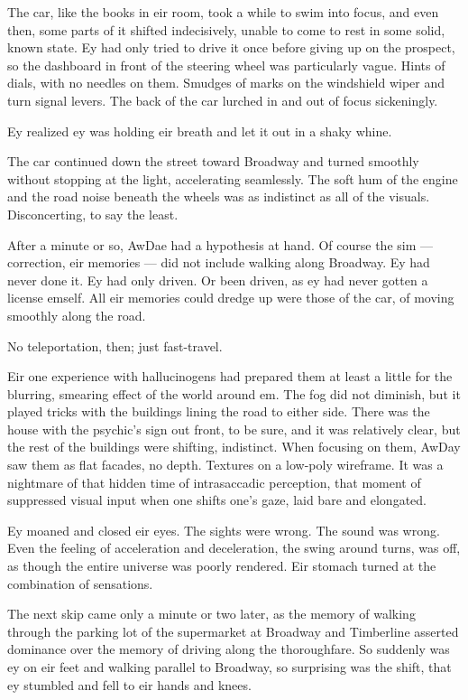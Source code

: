The car, like the books in eir room, took a while to swim into focus, and even then, some parts of it shifted indecisively, unable to come to rest in some solid, known state. Ey had only tried to drive it once before giving up on the prospect, so the dashboard in front of the steering wheel was particularly vague. Hints of dials, with no needles on them. Smudges of marks on the windshield wiper and turn signal levers. The back of the car lurched in and out of focus sickeningly.

Ey realized ey was holding eir breath and let it out in a shaky whine.

The car continued down the street toward Broadway and turned smoothly without stopping at the light, accelerating seamlessly. The soft hum of the engine and the road noise beneath the wheels was as indistinct as all of the visuals. Disconcerting, to say the least.

After a minute or so, AwDae had a hypothesis at hand. Of course the sim --- correction, eir memories --- did not include walking along Broadway. Ey had never done it. Ey had only driven. Or been driven, as ey had never gotten a license emself. All eir memories could dredge up were those of the car, of moving smoothly along the road.

No teleportation, then; just fast-travel.

Eir one experience with hallucinogens had prepared them at least a little for the blurring, smearing effect of the world around em. The fog did not diminish, but it played tricks with the buildings lining the road to either side. There was the house with the psychic's sign out front, to be sure, and it was relatively clear, but the rest of the buildings were shifting, indistinct. When focusing on them, AwDay saw them as flat facades, no depth. Textures on a low-poly wireframe. It was a nightmare of that hidden time of intrasaccadic perception, that moment of suppressed visual input when one shifts one's gaze, laid bare and elongated.

Ey moaned and closed eir eyes. The sights were wrong. The sound was wrong. Even the feeling of acceleration and deceleration, the swing around turns, was off, as though the entire universe was poorly rendered. Eir stomach turned at the combination of sensations.

The next skip came only a minute or two later, as the memory of walking through the parking lot of the supermarket at Broadway and Timberline asserted dominance over the memory of driving along the thoroughfare. So suddenly was ey on eir feet and walking parallel to Broadway, so surprising was the shift, that ey stumbled and fell to eir hands and knees.


